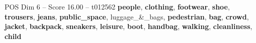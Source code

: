 \begin{textsample}{POS Dim 6 – Score 16.00 – t012562}  \label{ex:f6_pos_020}
\textbf{people}, \textbf{clothing}, \textbf{footwear}, \textbf{shoe}, \textbf{trousers}, \textbf{jeans}, \textbf{public\_space}, luggage\_\&\_bags, \textbf{pedestrian}, \textbf{bag}, \textbf{crowd}, \textbf{jacket}, \textbf{backpack}, \textbf{sneakers}, \textbf{leisure}, \textbf{boot}, \textbf{handbag}, \textbf{walking}, \textbf{cleanliness}, \textbf{child}

\end{textsample}
